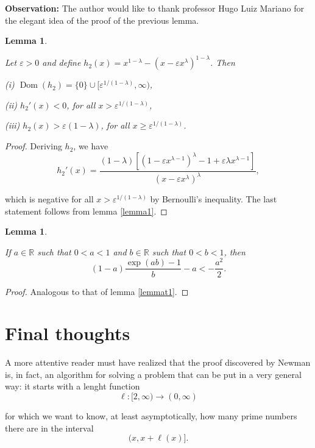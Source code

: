 \documentclass[11pt]{amsart}
\newtheorem{lemma}[theorem]{Lemma}
\numberwithin{equation}{section}
\newcommand{\R}{\mathbb{R}}
\DeclareMathOperator{\Dom}{Dom}
\newcommand{\difrac}{\displaystyle \frac}
\begin{document}
\noindent \textbf{Observation:} The author would like to thank professor Hugo Luiz Mariano for the elegant idea of the proof of the previous lemma.

\begin{lemma} \label{lemmah2}

Let $\varepsilon > 0$ and define $h_2(x) = x^{1 - \lambda} - (x - \varepsilon x^{\lambda})^{1 - \lambda}$. Then

\noindent (i) $\Dom(h_2) = \{0\} \cup [\varepsilon^{1/(1 - \lambda)}, \infty)$,

\noindent (ii) $h_2'(x) < 0$, for all $x > \varepsilon^{1/(1 - \lambda)}$,

\noindent (iii) $h_2(x) > \varepsilon(1 - \lambda)$, for all $x \geq \varepsilon^{1/(1 - \lambda)}$.

\end{lemma}

\begin{proof} Deriving $h_2$, we have $$h_2'(x) = \difrac{(1 - \lambda)[(1 - \varepsilon x^{\lambda - 1})^{\lambda} - 1 + \varepsilon \lambda x^{\lambda - 1}]}{(x - \varepsilon x^{\lambda})^{\lambda}},$$

\noindent which is negative for all $x > \varepsilon^{1/(1 - \lambda)}$ by Bernoulli's inequality. The last statement follows from lemma \ref{lemma1}. \end{proof}

\begin{lemma} \label{lemmat2}

If $a \in \R$ such that $0 < a < 1$ and $b \in \R$ such that $0 < b < 1$, then $$(1 - a) \difrac{\exp(ab) - 1}{b} - a < -\difrac{a^2}{2}.$$

\end{lemma}

\begin{proof} Analogous to that of lemma \ref{lemmat1}. \end{proof}

\section{Final thoughts} \label{section4}

A more attentive reader must have realized that the proof discovered by Newman is, in fact, an algorithm for solving a problem that can be put in a very general way: it starts with a lenght function $$\ell: [2, \infty) \rightarrow (0, \infty)$$

\noindent for which we want to know, at least asymptotically, how many prime numbers there are in the interval $$(x, x + \ell (x)].$$
\end{document}
